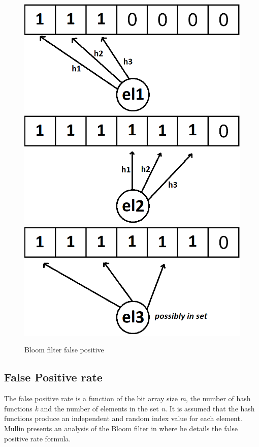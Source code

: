 \begin{figure}[!htb]
    \begin{center}
      \includegraphics[scale=0.4]{figures/fp-bloom-1.png}
      \includegraphics[scale=0.4]{figures/fp-bloom-2.png}
      \includegraphics[scale=0.4]{figures/fp-bloom-3.png}
      \caption{Bloom filter false positive}
      \label{fig:bloom-filter-fp}
    \end{center}
\end{figure}


\subsection*{False Positive rate}
The false positive rate is a function of the bit array size \textit{m}, the number of hash functions \textit{k} and the number of elements in the set \textit{n}. It is assumed that the hash functions produce an independent and random index value for each element. Mullin presents an analysis of the Bloom filter in \cite{Mullin-Bloom-Analysis} where he details the false positive rate formula. 

